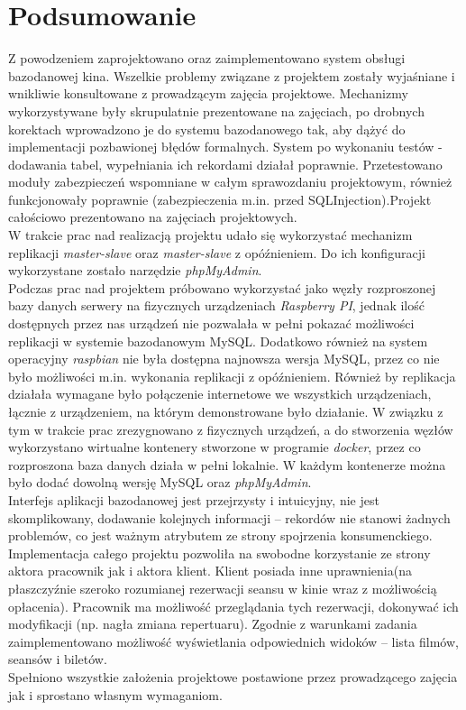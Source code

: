 \chapter{Podsumowanie}

Z powodzeniem zaprojektowano oraz zaimplementowano system obsługi bazodanowej kina.
Wszelkie problemy związane z projektem zostały wyjaśniane i wnikliwie konsultowane z prowadzącym
zajęcia projektowe. Mechanizmy wykorzystywane były skrupulatnie prezentowane na zajęciach,
po drobnych korektach wprowadzono je do systemu bazodanowego tak, aby dążyć do
implementacji pozbawionej błędów formalnych.
System po wykonaniu testów -dodawania tabel, wypełniania ich rekordami działał poprawnie.
Przetestowano moduły zabezpieczeń wspomniane w całym sprawozdaniu projektowym, również
funkcjonowały poprawnie (zabezpieczenia m.in. przed SQLInjection).Projekt całościowo prezentowano
na zajęciach projektowych.\\

W trakcie prac nad realizacją projektu udało się wykorzystać mechanizm replikacji \textit{master-slave} oraz \textit{master-slave} z opóźnieniem. Do ich konfiguracji wykorzystane zostało narzędzie \textit{phpMyAdmin}. \\

Podczas prac nad projektem próbowano wykorzystać jako węzły rozproszonej bazy danych serwery na fizycznych urządzeniach \textit{Raspberry PI}, jednak ilość dostępnych przez nas urządzeń nie pozwalała w pełni pokazać możliwości replikacji w systemie bazodanowym MySQL. Dodatkowo również na system operacyjny \textit{raspbian} nie była dostępna najnowsza wersja MySQL, przez co nie było możliwości m.in. wykonania replikacji z opóźnieniem. Również by replikacja działała wymagane było połączenie internetowe we wszystkich urządzeniach, łącznie z urządzeniem, na którym demonstrowane było działanie. W związku z tym w trakcie prac zrezygnowano z fizycznych urządzeń, a do stworzenia węzłów wykorzystano wirtualne kontenery stworzone w programie \textit{docker}, przez co rozproszona baza danych działa w pełni lokalnie. W każdym kontenerze można było dodać dowolną wersję MySQL oraz \textit{phpMyAdmin}.\\


Interfejs aplikacji bazodanowej jest przejrzysty i intuicyjny, nie jest skomplikowany, dodawanie kolejnych informacji – rekordów nie stanowi żadnych problemów, co jest ważnym atrybutem ze strony spojrzenia konsumenckiego. Implementacja całego projektu pozwoliła na swobodne korzystanie ze strony aktora pracownik jak i aktora klient. Klient posiada inne uprawnienia(na płaszczyźnie szeroko rozumianej rezerwacji seansu w kinie wraz z możliwością opłacenia). Pracownik ma możliwość przeglądania tych rezerwacji, dokonywać ich modyfikacji (np. nagła zmiana repertuaru). Zgodnie z warunkami zadania zaimplementowano możliwość wyświetlania odpowiednich widoków – lista filmów, seansów i biletów.\\

Spełniono wszystkie założenia projektowe postawione przez prowadzącego zajęcia jak i sprostano własnym wymaganiom.